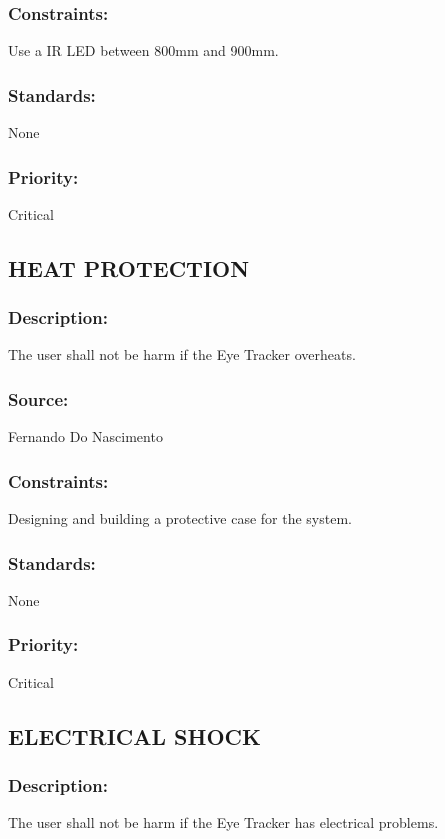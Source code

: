 \subsubsection{Constraints:} 
	{Use a IR LED between 800mm and 900mm.}
\subsubsection{Standards:} 
	{None}
\subsubsection{Priority:} 
	{Critical}
\newline
\newline
	
\subsection{\text HEAT PROTECTION}
\subsubsection{Description:} 
	{The user shall not be harm if the Eye Tracker overheats.}
\subsubsection{Source:} 
	{Fernando Do Nascimento}
\subsubsection{Constraints:} 
	{Designing and building a protective case for the system.}
\subsubsection{Standards:} 
	{None}
\subsubsection{Priority:} 
	{Critical}
\newline
\newline
	
\subsection{\text ELECTRICAL SHOCK}
\subsubsection{Description:} 
	{The user shall not be harm if the Eye Tracker has electrical problems.}
